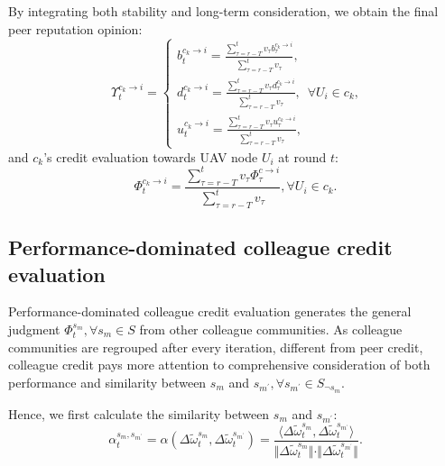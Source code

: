 \documentclass[lettersize,journal]{IEEEtran}
\begin{document}
By integrating both stability and long-term consideration, we obtain the final peer reputation opinion: 
\begin{equation}
\Upsilon^{c_k \rightarrow i}_{t}=
\left  \{
      \begin{array}{ll}%
        b^{c_k \rightarrow i}_{t}=\frac{\sum_{\tau=r-T}^{t}{v_{\tau} b^{c_k \rightarrow i}_{\tau}}}{\sum_{\tau=r-T}^{t}{v_{\tau}}},\\
        d^{c_k \rightarrow i}_{t}=\frac{\sum_{\tau=r-T}^{t}{v_{\tau} d^{c_k \rightarrow i}_{\tau}}}{\sum_{\tau=r-T}^{t}{v_{\tau}}},\\
        u^{c_k \rightarrow i}_{t}=\frac{\sum_{\tau=r-T}^{t}{v_{\tau} u^{c_k \rightarrow i}_{\tau}}}{\sum_{\tau=r-T}^{t}{v_{\tau}}}  ,              
    \end{array}
\right.
\forall U_i\in c_k,
\end{equation}
and $c_k$'s credit evaluation towards UAV node $U_i$ at round $t$:
\begin{equation}
\Phi^{c_k \rightarrow i}_{t}=\frac{\sum_{\tau=r-T}^{t}{v_{\tau} \Phi^{c \rightarrow i}_{\tau}}}{\sum_{\tau=r-T}^{t}{v_{\tau}}}, \forall U_i\in c_k.             
\end{equation}

\subsection{Performance-dominated colleague credit evaluation}
Performance-dominated colleague credit evaluation generates the general judgment $\Phi^{s_m}_{t}, \forall s_m\in S$ from other colleague communities. 
As colleague communities are regrouped after every iteration, different from peer credit, colleague credit pays more attention to comprehensive consideration of both performance and similarity between $s_m$ and $s_{m^{\prime}}, \forall s_{m^{\prime}} \in S_{\neg s_m}$. 

Hence, we first calculate the similarity between $s_m$ and $s_{m^{\prime}}$:
\begin{equation}
    	  \alpha^{s_{m},s_{m^{\prime}}}_{t}= \alpha( \Delta \widetilde{\omega}^{s_{m}}_{t},  \Delta\widetilde{\omega}^{s_{m^{\prime}}}_{t}) = \frac{\langle  \Delta\widetilde{\omega}^{s_{m}}_{t}, \Delta\widetilde{\omega}^{s_{m^{\prime}}}_{t}\rangle}{\Vert  \Delta\widetilde{\omega}^{s_{m}}_{t}\Vert\cdot\Vert  \Delta\widetilde{\omega}^{s_{m^{\prime}}}_{t}\Vert }.
\end{equation}
\end{document}
